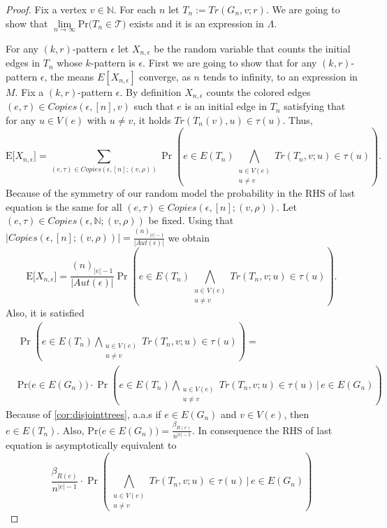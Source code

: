 \documentclass[12pt,notitlepage,a4paper]{article}
\theoremstyle{definition}
\newcommand{\N}{\mathbb{N}}
\newcommand{\Ln}{\lim\limits_{n\to \infty}}
\newcommand{\PR}[1]{\mathrm{Pr}\big(#1\big)}
\begin{document}
	\begin{proof}
		Fix a vertex $v\in \N$. For each $n$ let
		$T_n:=Tr(G_n,v;r)$. We are going to show that
		$\Ln \PR{T_n\in \mathcal{T}}$ exists and it is an 
		expression in $\Lambda$. \par
		For any $(k,r)$-pattern  $\epsilon$  let 
		$X_{n,\epsilon}$ be the random variable that counts
		the initial edges in $T_n$ whose $k$-pattern
		is $\epsilon$. First we are going to show that for any
		$(k,r)$-pattern $\epsilon$, the means $E[X_{n,\epsilon}]$
		converge, as $n$ tends to infinity, to an expression in $M$.
		Fix a $(k,r)$-pattern $\epsilon$. 
		By definition $X_{n,\epsilon}$ counts
		the colored edges $(e,\tau)\in Copies(\epsilon,[n],v)$ 
		such that $e$ is an initial edge in $T_n$ satisfying that
		for any $u\in V(e)$ with $u\neq v$, it holds
		$Tr(T_n(v),u)\in \tau(u)$. Thus,
		\[
		\mathrm{E}\big[ X_{n,\epsilon} \big]
		= \sum_{(e,\tau)\in Copies(\epsilon,[n];(v,\rho))} \Pr
		\left(e\in E(T_n)
		\bigwedge_{\substack{u\in V(e)\\ u\neq v} } Tr(T_{n}, v; u)\in 
		\tau(u) \right).
		\]
		Because of the symmetry of our random model the probability 
		in the RHS of last equation is the same for all 
		$(e,\tau)\in Copies(\epsilon,[n];(v,\rho))$. Let
		$(e,\tau)\in Copies(\epsilon,\N;(v,\rho))$ be fixed. 
		Using that 
		$|Copies(\epsilon,[n];(v,\rho))|=\frac{(n)_{|e|-1}}
		{|Aut(\epsilon)|}$ we obtain
		\[
		\mathrm{E}\big[ X_{n,\epsilon} \big]
		=
		\frac{(n)_{|e|-1}}{|
			Aut(\epsilon)|} \Pr
		\left(e\in E(T_{n})
		\bigwedge_{\substack{u\in V(e)\\ u\neq v} } 
		Tr(T_n, v; u)\in \tau(u) \right).
		\]
		Also, it is satisfied
		\begin{align*}
		&\Pr
		\left( e\in E(T_{n})
		\bigwedge_{\substack{u\in V(e)\\ u\neq v} } Tr(T_n, v; u)\in 
		\tau(u) \right)=\\
		&\PR{ e\in E(G_n)} \cdot
		\Pr
		\left( e\in E(T_{n})
		\bigwedge_{\substack{u\in V(e)\\ u\neq v} } 
		Tr(T_{n}, v; u)\in \tau(u) \, \Bigg| \,  e\in E(G_n) \right)
		\end{align*}
		Because of \cref{cor:disjointtrees}, a.a.s if $e\in E(G_n)$
		and $v\in V(e)$, then $e\in E(T_n)$. Also,
		$\PR{e\in E(G_n)}=\frac{\beta_{R(e)}}{n^{|e|-1}}$. In consequence
		the RHS of last equation is asymptotically equivalent
		to
		\[
		\frac{\beta_{R(e)}}{n^{|e|-1}} \cdot
		\Pr	\left(
		\bigwedge_{\substack{u\in V(e)\\ u\neq v} } Tr(T_{n}, v; u)\in \tau(u) \, \Bigg| \,  e\in E(G_n) \right)
\]
\end{proof}
\end{document}
